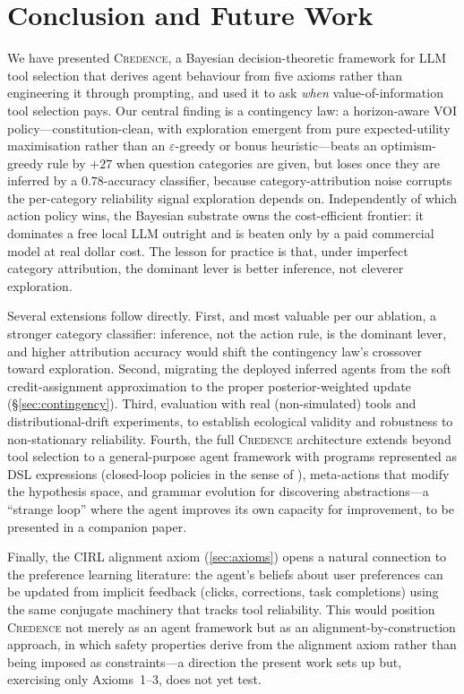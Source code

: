 \documentclass[11pt]{article}
\newcommand{\credence}{\textsc{Credence}}
\begin{document}
\section{Conclusion and Future Work}
\label{sec:conclusion}

We have presented \credence{}, a Bayesian decision-theoretic framework for LLM tool selection that derives agent behaviour from five axioms rather than engineering it through prompting, and used it to ask \emph{when} value-of-information tool selection pays. Our central finding is a contingency law: a horizon-aware VOI policy---constitution-clean, with exploration emergent from pure expected-utility maximisation rather than an $\varepsilon$-greedy or bonus heuristic---beats an optimism-greedy rule by $+27$ when question categories are given, but loses once they are inferred by a $0.78$-accuracy classifier, because category-attribution noise corrupts the per-category reliability signal exploration depends on. Independently of which action policy wins, the Bayesian substrate owns the cost-efficient frontier: it dominates a free local LLM outright and is beaten only by a paid commercial model at real dollar cost. The lesson for practice is that, under imperfect category attribution, the dominant lever is better inference, not cleverer exploration.

Several extensions follow directly. First, and most valuable per our ablation, a stronger category classifier: inference, not the action rule, is the dominant lever, and higher attribution accuracy would shift the contingency law's crossover toward exploration. Second, migrating the deployed inferred agents from the soft credit-assignment approximation to the proper posterior-weighted update (\S\ref{sec:contingency}). Third, evaluation with real (non-simulated) tools and distributional-drift experiments, to establish ecological validity and robustness to non-stationary reliability. Fourth, the full \credence{} architecture extends beyond tool selection to a general-purpose agent framework with programs represented as DSL expressions (closed-loop policies in the sense of \citealt{sutton1999between}), meta-actions that modify the hypothesis space, and grammar evolution for discovering abstractions---a ``strange loop'' where the agent improves its own capacity for improvement, to be presented in a companion paper.

Finally, the CIRL alignment axiom (\cref{sec:axioms}) opens a natural connection to the preference learning literature: the agent's beliefs about user preferences can be updated from implicit feedback (clicks, corrections, task completions) using the same conjugate machinery that tracks tool reliability. This would position \credence{} not merely as an agent framework but as an alignment-by-construction approach, in which safety properties derive from the alignment axiom rather than being imposed as constraints---a direction the present work sets up but, exercising only Axioms~1--3, does not yet test.
\end{document}
